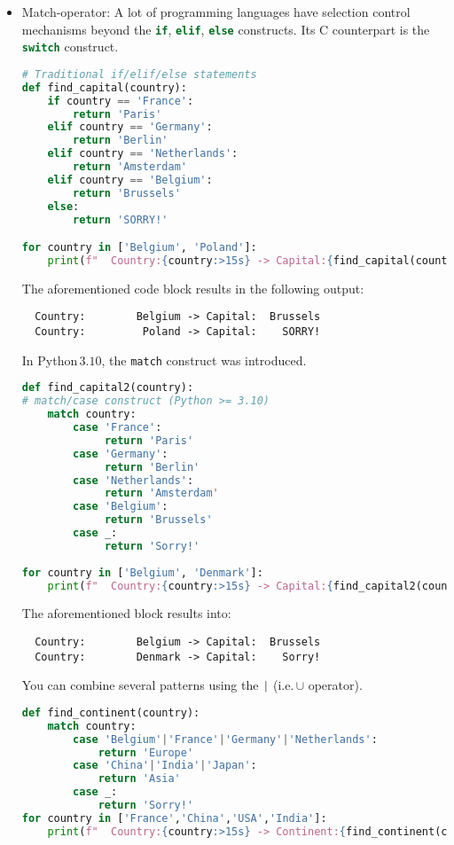 \documentclass[10pt]{article}
\begin{document}
\begin{itemize}
	\item Match-operator:\newline
A lot of programming languages have selection control mechanisms 
		beyond the \lstinline[language=python]{if}, \lstinline[language=python]{elif}, \lstinline[language=python]{else} constructs. 
		Its C counterpart is the \lstinline[language=c]{switch} construct.

\begin{lstlisting}[language=python]
# Traditional if/elif/else statements
def find_capital(country):
    if country == 'France':
        return 'Paris'
    elif country == 'Germany':
        return 'Berlin'
    elif country == 'Netherlands':
        return 'Amsterdam'
    elif country == 'Belgium':
        return 'Brussels'
    else:
        return 'SORRY!'

for country in ['Belgium', 'Poland']:
    print(f"  Country:{country:>15s} -> Capital:{find_capital(country):>10s}")

\end{lstlisting}

The aforementioned code block results in the following output:
\begin{verbatim}
  Country:        Belgium -> Capital:  Brussels
  Country:         Poland -> Capital:    SORRY!
\end{verbatim}

In Python\,$3.10$, the \lstinline[language=python]{match} construct 
was introduced.
\begin{lstlisting}[language=python] 
def find_capital2(country):
# match/case construct (Python >= 3.10)
    match country:
        case 'France':
             return 'Paris'
        case 'Germany':
             return 'Berlin'
        case 'Netherlands':
             return 'Amsterdam'
        case 'Belgium':
             return 'Brussels'
        case _:
             return 'Sorry!'
    
for country in ['Belgium', 'Denmark']:
    print(f"  Country:{country:>15s} -> Capital:{find_capital2(country):>10s}")
\end{lstlisting}

The aforementioned block results into:
\begin{verbatim}
  Country:        Belgium -> Capital:  Brussels
  Country:        Denmark -> Capital:    Sorry!
\end{verbatim}

		You can combine several patterns using the  \lstinline[language=python]{|} (i.e.\,$\cup$ operator).
\begin{lstlisting}[language=python]
def find_continent(country):
    match country:
        case 'Belgium'|'France'|'Germany'|'Netherlands':
            return 'Europe'
        case 'China'|'India'|'Japan':
            return 'Asia'
        case _:
            return 'Sorry!'
for country in ['France','China','USA','India']:
    print(f"  Country:{country:>15s} -> Continent:{find_continent(country):>10s}")
\end{lstlisting}


\end{itemize}
\end{document}
